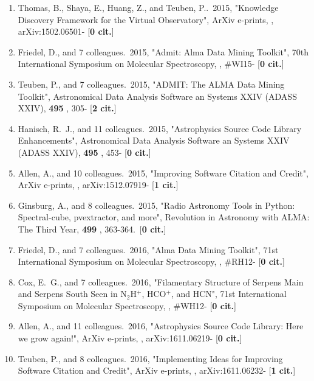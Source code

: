 \documentclass[11pt,letterpaper]{article}
\begin{document}
\begin{enumerate}[resume,label=\textbf{\arabic*}.]
\item  
Thomas, B., Shaya, E., Huang, Z., and Teuben, P..\  2015,  "Knowledge 
Discovery Framework for the Virtual Observatory", ArXiv e-prints,  , 
arXiv:1502.06501- [{\bf 0 cit.}] 


\item  
Friedel, D., and 7 colleagues.\  2015,  "Admit: Alma Data Mining Toolkit", 
70th International Symposium on Molecular Spectroscopy,  , \#WI15- [{\bf 0 
cit.}] 

\item  
Teuben, P., and 7 colleagues.\  2015,  "ADMIT: The ALMA Data Mining 
Toolkit", Astronomical Data Analysis Software an Systems XXIV (ADASS XXIV),  
{\bf 495} , 305- [{\bf 2 cit.}] 

\item  
Hanisch, R.~J., and 11 colleagues.\  2015,  "Astrophysics Source Code 
Library Enhancements", Astronomical Data Analysis Software an Systems XXIV 
(ADASS XXIV),  {\bf 495} , 453- [{\bf 0 cit.}] 

\item  
Allen, A., and 10 colleagues.\  2015,  "Improving Software Citation and 
Credit", ArXiv e-prints,  , arXiv:1512.07919- [{\bf 1 cit.}] 

\item  
Ginsburg, A., and 8 colleagues.\  2015,  "Radio Astronomy Tools in Python: 
Spectral-cube, pvextractor, and more", Revolution in Astronomy with ALMA: 
The Third Year,  {\bf 499} , 363-364.\  [{\bf 0 cit.}] 


\item  
Friedel, D., and 7 colleagues.\  2016,  "Alma Data Mining Toolkit", 71st 
International Symposium on Molecular Spectroscopy,  , \#RH12- [{\bf 0 
cit.}] 

\item  
Cox, E.~G., and 7 colleagues.\  2016,  "Filamentary Structure of Serpens 
Main and Serpens South Seen in N$_{2}$H$^{+}$, HCO$^{+}$, and HCN", 71st 
International Symposium on Molecular Spectroscopy,  , \#WH12- [{\bf 0 
cit.}] 

\item  
Allen, A., and 11 colleagues.\  2016,  "Astrophysics Source Code Library: 
Here we grow again!", ArXiv e-prints,  , arXiv:1611.06219- [{\bf 0 cit.}] 

\item  
Teuben, P., and 8 colleagues.\  2016,  "Implementing Ideas for Improving 
Software Citation and Credit", ArXiv e-prints,  , arXiv:1611.06232- [{\bf 1 
cit.}] 




\end{enumerate}
\end{document}
